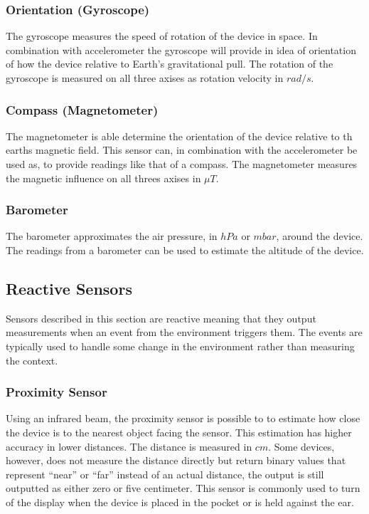 \subsubsection{Orientation (Gyroscope)}
The gyroscope measures the speed of rotation of the device in space. In combination with accelerometer the gyroscope will provide in idea of orientation of how the device relative to Earth's gravitational pull. The rotation of the gyroscope is measured on all three axises as rotation velocity in $rad/s$.

\subsubsection{Compass (Magnetometer)}
The magnetometer is able determine the orientation of the device relative to th earths magnetic field. This sensor can, in combination with the accelerometer be used as, to provide readings like that of a compass. The magnetometer measures the magnetic influence on all threes axises in $\mu T$.

\subsubsection{Barometer}
The barometer approximates the air pressure, in $hPa$ or $mbar$, around the device. The readings from a barometer can be used to estimate the altitude of the device. 


\subsection{Reactive Sensors}
Sensors described in this section are reactive meaning that they output measurements when an event from the environment triggers them. The events are typically used to handle some change in the environment rather than measuring the context.

\subsubsection{Proximity Sensor}
Using an infrared beam, the proximity sensor is possible to to estimate how close the device is to the nearest object facing the sensor. This estimation has higher accuracy in lower distances. The distance is measured in $cm$. Some devices, however, does not measure the distance directly but return binary values that represent ``near'' or ``far'' instead of an actual distance, the output is still outputted as either zero or five centimeter. This sensor is commonly used to turn of the display when the device is placed in the pocket or is held against the ear.


